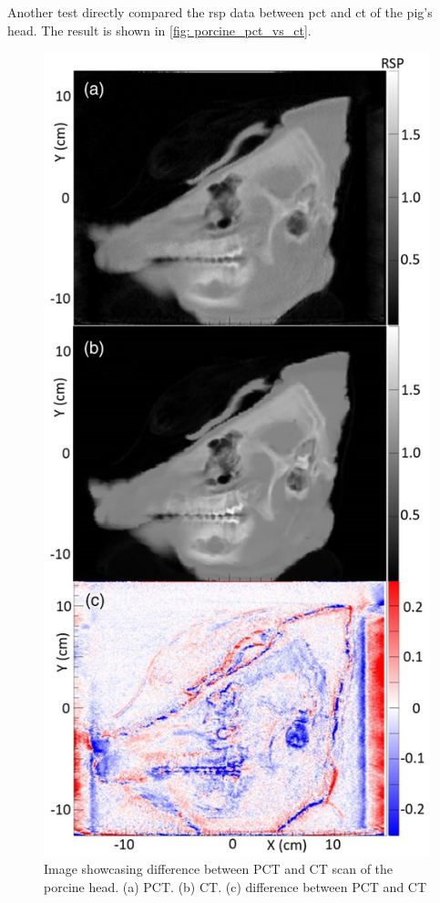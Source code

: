 \documentclass[main.tex]{subfiles}
\begin{document}
Another test directly compared the \gls{rsp} data between \gls{pct} and \gls{ct} of the pig's head. The result is shown in \autoref{fig: porcine_pct_vs_ct}.

\begin{figure}[!ht]
    \centering
    \includegraphics[scale=2.5]{images/porcine_comparison.jpg}
    \caption{Image showcasing difference between PCT and CT scan of the porcine head. (a) PCT. (b) CT. (c) difference between PCT and CT \cite{porcine_2021}}
    \label{fig: porcine_pct_vs_ct}
\end{figure}
\FloatBarrier
\end{document}
